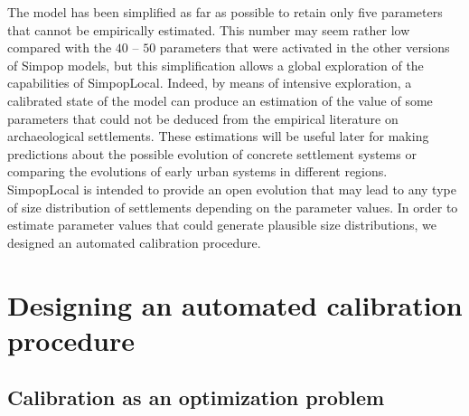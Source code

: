 The model has been simplified as far as possible to retain only five parameters that cannot be empirically estimated. This number may seem rather low compared with the $40$ – $50$ parameters that were activated in the other versions of Simpop models, but this simplification allows a global exploration of the capabilities of SimpopLocal. Indeed, by means of intensive exploration, a calibrated state of the model can produce an estimation of the value of some parameters that could not be deduced from the empirical literature on archaeological settlements. These estimations will be useful later for making predictions about the possible evolution of concrete settlement systems or comparing the evolutions of early urban systems in different regions. SimpopLocal is intended to provide an open evolution that may lead to any type of size distribution of settlements depending on the parameter values. In order to estimate parameter values that could generate plausible size distributions, we designed an automated calibration procedure.

\section{Designing an automated calibration procedure}
\label{sec:automated_calibration}

\subsection{Calibration as an optimization problem}
\label{subsec:calibration}

